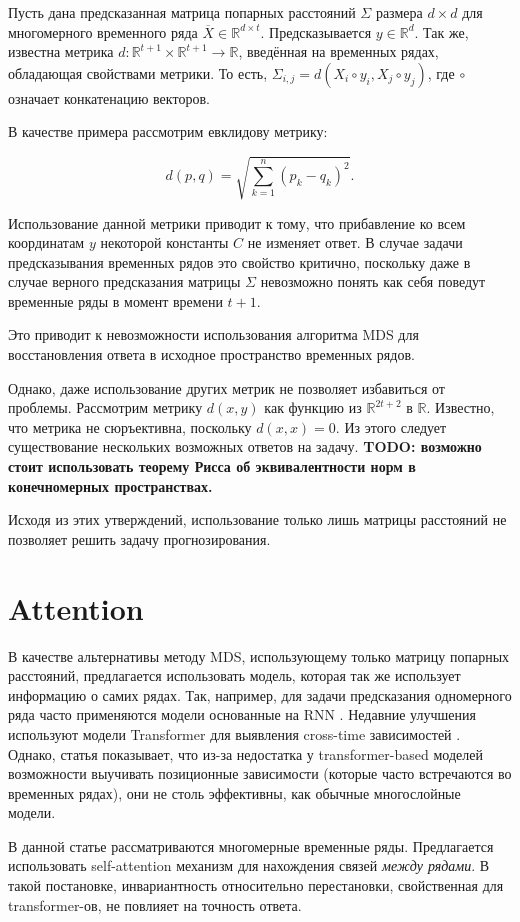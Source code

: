 \documentclass{article}
\begin{document}
Пусть дана предсказанная матрица попарных расстояний $\Sigma$ размера $d \times d$ для многомерного временного ряда $\overline{X} \in \mathbb{R}^{d \times t}$. Предсказывается $y \in \mathbb{R}^d$. Так же, известна метрика $d : \mathbb{R}^{t+1} \times \mathbb{R}^{t+1} \rightarrow \mathbb{R}$, введённая на временных рядах, обладающая свойствами метрики. То есть, $\Sigma_{i,j} = d(X_i \circ y_i, X_j \circ y_j)$, где $\circ$ означает конкатенацию векторов.

В качестве примера рассмотрим евклидову метрику: 

$$d(p,q)=\sqrt{\sum_{k=1}^n (p_k-q_k)^2}.$$

Использование данной метрики приводит к тому, что прибавление ко всем координатам $y$ некоторой константы $C$ не изменяет ответ. В случае задачи предсказывания временных рядов это свойство критично, поскольку даже в случае верного предсказания матрицы $\Sigma$ невозможно понять как себя поведут временные ряды в момент времени $t+1$.

Это приводит к невозможности использования алгоритма MDS для восстановления ответа в исходное пространство временных рядов.

Однако, даже использование других метрик не позволяет избавиться от проблемы. Рассмотрим метрику $d(x, y)$ как функцию из $\mathbb{R}^{2t+2}$ в $\mathbb{R}$. Известно, что метрика не сюръективна, поскольку $d(x, x) = 0$. Из этого следует существование нескольких возможных ответов на задачу. \textbf{TODO: возможно стоит использовать теорему Рисса об эквивалентности норм в конечномерных пространствах.}

Исходя из этих утверждений, использование только лишь матрицы расстояний не позволяет решить задачу прогнозирования.

\section{Attention}

В качестве альтернативы методу MDS, использующему только матрицу попарных расстояний, предлагается использовать модель, которая так же использует информацию о самих рядах. Так, например, для задачи предсказания одномерного ряда часто применяются модели основанные на RNN \cite{lin2023segrnn}. Недавние улучшения используют модели Transformer для выявления cross-time зависимостей \cite{zhou2021informer}. Однако, статья \cite{zeng2022transformers} показывает, что из-за недостатка у transformer-based моделей возможности выучивать позиционные зависимости (которые часто встречаются во временных рядах), они не столь эффективны, как обычные многослойные модели.

В данной статье рассматриваются многомерные временные ряды. Предлагается использовать self-attention механизм для нахождения связей \textit{между рядами}. В такой постановке, инвариантность относительно перестановки, свойственная для transformer-ов, не повлияет на точность ответа.



\end{document}
